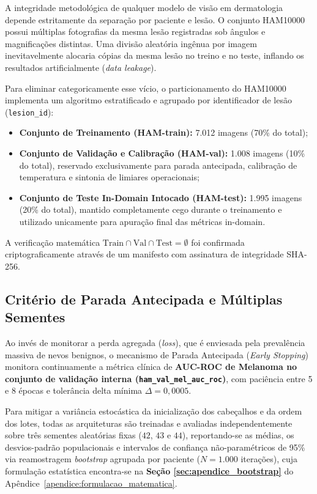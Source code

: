 \documentclass[oneside,english,brazilian]{UNISINOSmonografia}
\begin{document}
A integridade metodológica de qualquer modelo de visão em dermatologia depende estritamente da separação por paciente e lesão. O conjunto HAM10000 possui múltiplas fotografias da mesma lesão registradas sob ângulos e magnificações distintas. Uma divisão aleatória ingênua por imagem inevitavelmente alocaria cópias da mesma lesão no treino e no teste, inflando os resultados artificialmente (\textit{data leakage}).

Para eliminar categoricamente esse vício, o particionamento do HAM10000 implementa um algoritmo estratificado e agrupado por identificador de lesão (\texttt{lesion\_id}):
\begin{itemize}
    \item \textbf{Conjunto de Treinamento (HAM-train):} 7.012 imagens (70\% do total);
    \item \textbf{Conjunto de Validação e Calibração (HAM-val):} 1.008 imagens (10\% do total), reservado exclusivamente para parada antecipada, calibração de temperatura e sintonia de limiares operacionais;
    \item \textbf{Conjunto de Teste In-Domain Intocado (HAM-test):} 1.995 imagens (20\% do total), mantido completamente cego durante o treinamento e utilizado unicamente para apuração final das métricas in-domain.
\end{itemize}

A verificação matemática $\text{Train} \cap \text{Val} \cap \text{Test} = \emptyset$ foi confirmada criptograficamente através de um manifesto com assinatura de integridade SHA-256.

\subsection{Critério de Parada Antecipada e Múltiplas Sementes}
Ao invés de monitorar a perda agregada (\textit{loss}), que é enviesada pela prevalência massiva de nevos benignos, o mecanismo de Parada Antecipada (\textit{Early Stopping}) monitora continuamente a métrica clínica de \textbf{AUC-ROC de Melanoma no conjunto de validação interna (\texttt{ham\_val\_mel\_auc\_roc})}, com paciência entre 5 e 8 épocas e tolerância delta mínima $\Delta = 0{,}0005$.

Para mitigar a variância estocástica da inicialização dos cabeçalhos e da ordem dos lotes, todas as arquiteturas são treinadas e avaliadas independentemente sobre três sementes aleatórias fixas ($42$, $43$ e $44$), reportando-se as médias, os desvios-padrão populacionais e intervalos de confiança não-paramétricos de 95\% via reamostragem \textit{bootstrap} agrupada por paciente ($N=1.000$ iterações), cuja formulação estatística encontra-se na \textbf{Seção \ref{sec:apendice_bootstrap}} do Apêndice~\ref{apendice:formulacao_matematica}.
\end{document}
